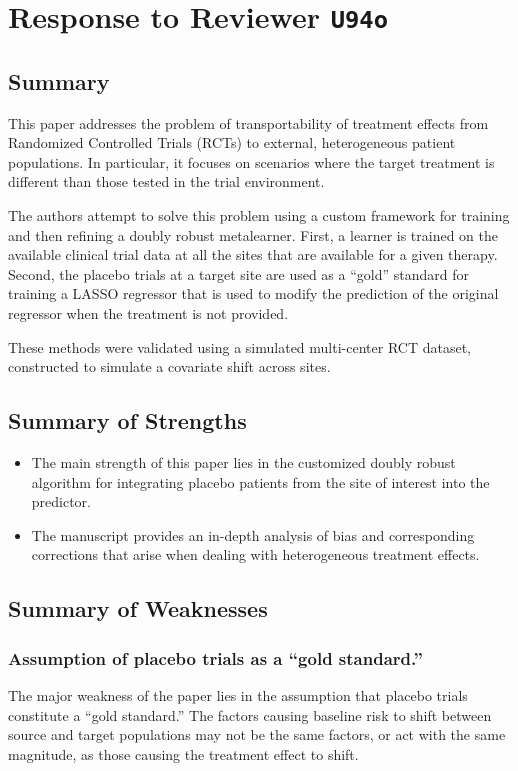 \section{Response to Reviewer \texttt{U94o}}


\subsection*{Summary}
This paper addresses the problem of transportability of treatment effects from Randomized Controlled Trials (RCTs) to external, heterogeneous patient populations. In particular, it focuses on scenarios where the target treatment is different than those tested in the trial environment.

The authors attempt to solve this problem using a custom framework for training and then refining a doubly robust metalearner. First, a learner is trained on the available clinical trial data at all the sites that are available for a given therapy. Second, the placebo trials at a target site are used as a ``gold'' standard for training a LASSO regressor that is used to modify the prediction of the original regressor when the treatment is not provided.

These methods were validated using a simulated multi-center RCT dataset, constructed to simulate a covariate shift across sites.


\subsection*{Summary of Strengths}

\begin{itemize}
    \item The main strength of this paper lies in the customized doubly robust algorithm for integrating placebo patients from the site of interest into the predictor.
    \item The manuscript provides an in-depth analysis of bias and corresponding corrections that arise when dealing with heterogeneous treatment effects.
\end{itemize}

\subsection*{Summary of Weaknesses}

\subsubsection{Assumption of placebo trials as a ``gold standard.''}  
The major weakness of the paper lies in the assumption that placebo trials constitute a ``gold standard.'' The factors causing baseline risk to shift between source and target populations may not be the same factors, or act with the same magnitude, as those causing the treatment effect to shift.

